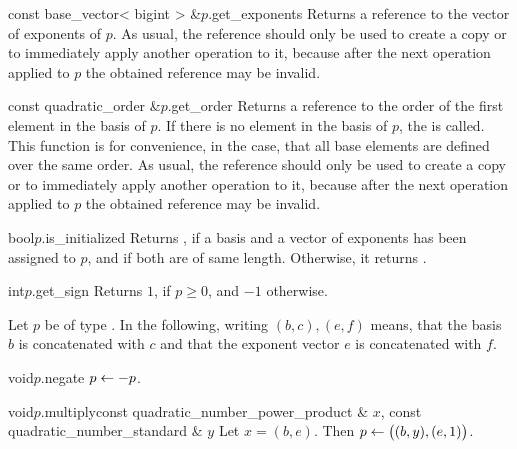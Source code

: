 \begin{fcode}{const base_vector< bigint > &}{$p$.get_exponents}{}
  Returns a  reference to the vector of exponents of $p$.  As usual, the
   reference should only be used to create a copy or to immediately apply another
  operation to it, because after the next operation applied to $p$ the obtained reference may be
  invalid.
\end{fcode}

\begin{fcode}{const quadratic_order &}{$p$.get_order}{}
  Returns a  reference to the order of the first element in the basis of $p$.  If
  there is no element in the basis of $p$, the \LEH is called.  This function is for
  convenience, in the case, that all base elements are defined over the same order.  As usual,
  the  reference should only be used to create a copy or to immediately apply
  another operation to it, because after the next operation applied to $p$ the obtained
  reference may be invalid.
\end{fcode}

\begin{fcode}{bool}{$p$.is_initialized}{}
  Returns \TRUE, if a basis and a vector of exponents has been assigned to $p$, and if both are
  of same length.  Otherwise, it returns \FALSE.
\end{fcode}

\begin{fcode}{int}{$p$.get_sign}{}
  Returns $1$, if $p \geq 0$, and $-1$ otherwise.
\end{fcode}



\ARTH

Let $p$ be of type .  In the following, writing
$(b,c),(e,f)$ means, that the basis $b$ is concatenated with $c$ and that the exponent vector
$e$ is concatenated with $f$.

\begin{fcode}{void}{$p$.negate}{}
  $p \leftarrow -p$.
\end{fcode}

\begin{fcode}{void}{$p$.multiply}{const quadratic_number_power_product & $x$,
    const quadratic_number_standard & $y$}%
  Let $x = (b,e)$.  Then $p \leftarrow \bigl((b,y),(e,1)\bigr)$.
\end{fcode}

